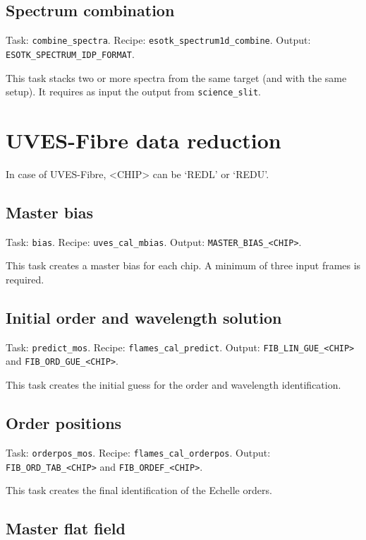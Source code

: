 \subsection{Spectrum combination}

Task: {\tt combine\_spectra}. Recipe: {\tt esotk\_spectrum1d\_combine}. \newline
Output: {\tt ESOTK\_SPECTRUM\_IDP\_FORMAT}.

This task stacks two or more spectra from the same target (and with the same setup).
It requires as input the output from {\tt science\_slit}.

\section{UVES-Fibre data reduction}

In case of UVES-Fibre, <CHIP> can be `REDL' or `REDU'.

\subsection{Master bias}

Task: {\tt bias}. Recipe: {\tt uves\_cal\_mbias}. Output: {\tt MASTER\_BIAS\_<CHIP>}.

This task creates a master bias for each chip. A minimum of three input frames is required.

\subsection{Initial order and wavelength solution}

Task: {\tt predict\_mos}. Recipe: {\tt flames\_cal\_predict}.
\newline Output: {\tt FIB\_LIN\_GUE\_<CHIP>} and 
{\tt FIB\_ORD\_GUE\_<CHIP>}.

This task creates the initial guess for the order and wavelength identification.

\subsection{Order positions}

Task: {\tt orderpos\_mos}. Recipe: {\tt flames\_cal\_orderpos}. 
\newline Output: {\tt FIB\_ORD\_TAB\_<CHIP>} and {\tt FIB\_ORDEF\_<CHIP>}.

This task creates the final identification of the Echelle orders.

\subsection{Master flat field}

